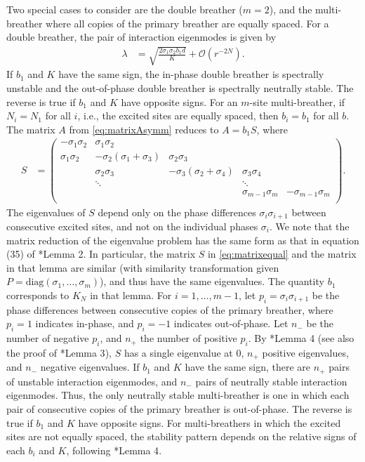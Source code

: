 \documentclass[12pt,reqno]{amsart}
\theoremstyle{definition}
\begin{document}
Two special cases to consider are the double breather ($m=2$), and the multi-breather where all copies of the primary breather are equally spaced. For a double breather, the pair of interaction eigenmodes is given by
\begin{align}\label{eq:inteigsdouble}
\lambda &= \sqrt{\frac{2 \sigma_1 \sigma_2 b_1 d}{K}} + \mathcal{O}(r^{-2N}).
\end{align}
If $b_1$ and $K$ have the same sign, the in-phase double breather is spectrally unstable and the out-of-phase double breather is spectrally neutrally stable. The reverse is true if $b_1$ and $K$ have opposite signs. For an $m$-site multi-breather, if $N_i = N_1$ for all $i$, i.e., the excited sites are equally spaced, then $b_i = b_1$ for all $b$. The matrix $A$ from \cref{eq:matrixAsymm} reduces to $A = b_1 S$, where 
\begin{align}\label{eq:matrixequal}
S &= \begin{pmatrix}
-\sigma_1 \sigma_2 & \sigma_1 \sigma_2 & & & \\
\sigma_1 \sigma_2 & -\sigma_2(\sigma_1+\sigma_3) & \sigma_2 \sigma_3 \\
& \sigma_2 \sigma_3 & -\sigma_3(\sigma_2+\sigma_4) & \sigma_3 \sigma_4 \\
& \ddots & & \ddots \\
& & & \sigma_{m-1}\sigma_m & -\sigma_{m-1}\sigma_m  \\
\end{pmatrix}.
\end{align}
The eigenvalues of $S$ depend only on the phase differences $\sigma_i \sigma_{i+1}$ between consecutive excited sites, and not on the individual phases $\sigma_i$. We note that the matrix reduction of the eigenvalue problem has the same form as that in equation (35) of \cite{Pelinovsky2012}*{Lemma 2}. In particular, the matrix $S$ in \cref{eq:matrixequal} and the matrix in that lemma are similar (with similarity transformation given $P = \text{diag}(\sigma_1, \dots, \sigma_m)$), and thus have the same eigenvalues. The quantity $b_1$ corresponds to $K_N$ in that lemma. For $i = 1, \dots, m-1$, let $p_i = \sigma_i\sigma_{i+1}$ be the phase differences between consecutive copies of the primary breather, where $p_i = 1$ indicates in-phase, and $p_i = -1$ indicates out-of-phase. Let $n_-$ be the number of negative $p_i$, and $n_+$ the number of positive $p_i$. By \cite{Sandstede1998}*{Lemma 4} (see also the proof of \cite{Pelinovsky2012}*{Lemma 3}), $S$ has a single eigenvalue at 0, $n_+$ positive eigenvalues, and $n_-$ negative eigenvalues. If $b_1$ and $K$ have the same sign, there are $n_+$ pairs of unstable interaction eigenmodes, and $n_-$ pairs of neutrally stable interaction eigenmodes. Thus, the only neutrally stable multi-breather is one in which each pair of consecutive copies of the primary breather is out-of-phase. The reverse is true if $b_1$ and $K$ have opposite signs. For multi-breathers in which the excited sites are not equally spaced, the stability pattern depends on the relative signs of each $b_i$ and $K$, following \cite{Sandstede1998}*{Lemma 4}.
\end{document}
